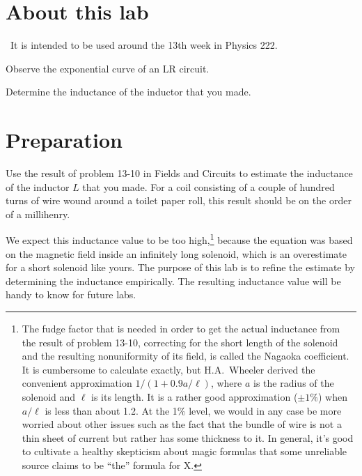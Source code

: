 \renewcommand\thechapter{c2.13b}
\label{lab:lr-circuit}

\section*{About this lab}

\covid\ 
It is intended to be used around the 13th week in Physics 222.

\apparatus
{}

\begin{goals}

\item[] Observe the exponential curve of an LR circuit.

\item[] Determine the inductance of the inductor that you made.
\end{goals}

\section*{Preparation}

Use the result of problem 13-10 in Fields and Circuits to estimate the
inductance of the inductor $L$ that you made. For a coil consisting of a couple of
hundred turns of wire wound around a toilet paper roll, this result should be
on the order of a millihenry.

We expect this inductance value to be too high,\footnote{The fudge factor that is needed in order to get the actual inductance from the
result of problem 13-10, correcting for the short length of the solenoid and the resulting nonuniformity of its
field, is called the Nagaoka coefficient. It is cumbersome to
calculate exactly, but H.A.~Wheeler derived the convenient approximation
$1/(1+0.9a/\ell)$, where $a$ is the radius of the solenoid and $\ell$ is
its length. It is a rather good approximation ($\pm1\%$) when $a/\ell$ is less than about 1.2.
At the 1\% level, we would in any case be more worried about other issues such as the fact that
the bundle of wire is not a thin sheet of current but rather has some thickness to it. In general,
it's good to cultivate a healthy skepticism about magic formulas that some unreliable source
claims to be ``the'' formula for X.} because the equation was based on the magnetic
field inside an infinitely long solenoid, which is an overestimate for a short solenoid
like yours. The purpose of this lab is to refine the estimate by determining the
inductance empirically. The resulting inductance value will be handy to know for
future labs.

